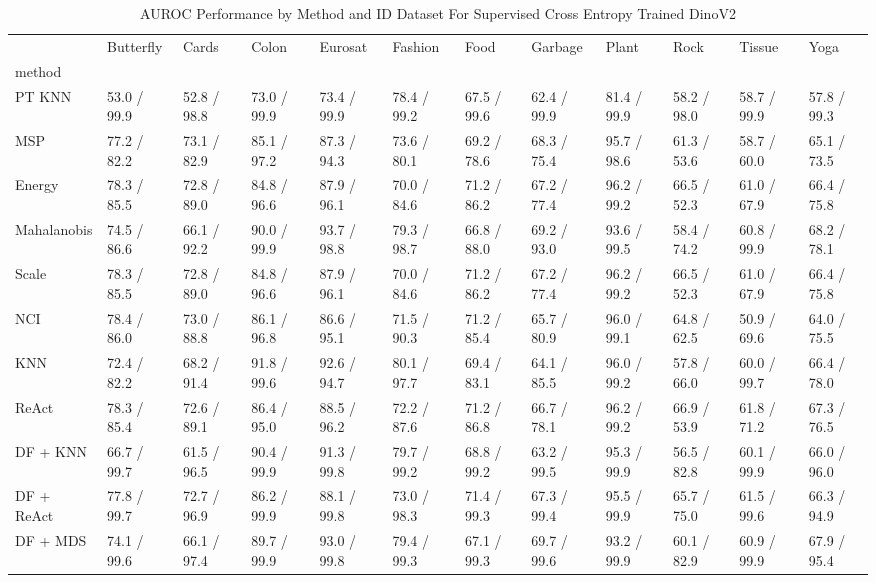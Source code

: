 \documentclass[letterpaper]{article} %
\theoremstyle{plain}
\theoremstyle{definition}
\theoremstyle{remark}
\begin{document}
\begin{table}
\caption{AUROC Performance by Method and ID Dataset For Supervised Cross Entropy Trained DinoV2}


\label{tab:auroc_results_dino}

\begin{tabular}{llllllllllll}
\toprule
  & Butterfly & Cards & Colon & Eurosat & Fashion & Food & Garbage & Plant & Rock & Tissue & Yoga \\
method &  &  &  &  &  &  &  &  &  &  &  \\
\midrule
PT KNN & 53.0 / 99.9 & 52.8 / 98.8 & 73.0 / 99.9 & 73.4 / 99.9 & 78.4 / 99.2 & 67.5 / 99.6 & 62.4 / 99.9 & 81.4 / 99.9 & 58.2 / 98.0 & 58.7 / 99.9 & 57.8 / 99.3 \\
MSP & 77.2 / 82.2 & 73.1 / 82.9 & 85.1 / 97.2 & 87.3 / 94.3 & 73.6 / 80.1 & 69.2 / 78.6 & 68.3 / 75.4 & 95.7 / 98.6 & 61.3 / 53.6 & 58.7 / 60.0 & 65.1 / 73.5 \\
Energy & 78.3 / 85.5 & 72.8 / 89.0 & 84.8 / 96.6 & 87.9 / 96.1 & 70.0 / 84.6 & 71.2 / 86.2 & 67.2 / 77.4 & 96.2 / 99.2 & 66.5 / 52.3 & 61.0 / 67.9 & 66.4 / 75.8 \\
Mahalanobis & 74.5 / 86.6 & 66.1 / 92.2 & 90.0 / 99.9 & 93.7 / 98.8 & 79.3 / 98.7 & 66.8 / 88.0 & 69.2 / 93.0 & 93.6 / 99.5 & 58.4 / 74.2 & 60.8 / 99.9 & 68.2 / 78.1 \\
Scale & 78.3 / 85.5 & 72.8 / 89.0 & 84.8 / 96.6 & 87.9 / 96.1 & 70.0 / 84.6 & 71.2 / 86.2 & 67.2 / 77.4 & 96.2 / 99.2 & 66.5 / 52.3 & 61.0 / 67.9 & 66.4 / 75.8 \\
NCI & 78.4 / 86.0 & 73.0 / 88.8 & 86.1 / 96.8 & 86.6 / 95.1 & 71.5 / 90.3 & 71.2 / 85.4 & 65.7 / 80.9 & 96.0 / 99.1 & 64.8 / 62.5 & 50.9 / 69.6 & 64.0 / 75.5 \\
KNN & 72.4 / 82.2 & 68.2 / 91.4 & 91.8 / 99.6 & 92.6 / 94.7 & 80.1 / 97.7 & 69.4 / 83.1 & 64.1 / 85.5 & 96.0 / 99.2 & 57.8 / 66.0 & 60.0 / 99.7 & 66.4 / 78.0 \\
ReAct & 78.3 / 85.4 & 72.6 / 89.1 & 86.4 / 95.0 & 88.5 / 96.2 & 72.2 / 87.6 & 71.2 / 86.8 & 66.7 / 78.1 & 96.2 / 99.2 & 66.9 / 53.9 & 61.8 / 71.2 & 67.3 / 76.5 \\
DF + KNN & 66.7 / 99.7 & 61.5 / 96.5 & 90.4 / 99.9 & 91.3 / 99.8 & 79.7 / 99.2 & 68.8 / 99.2 & 63.2 / 99.5 & 95.3 / 99.9 & 56.5 / 82.8 & 60.1 / 99.9 & 66.0 / 96.0 \\
DF + ReAct & 77.8 / 99.7 & 72.7 / 96.9 & 86.2 / 99.9 & 88.1 / 99.8 & 73.0 / 98.3 & 71.4 / 99.3 & 67.3 / 99.4 & 95.5 / 99.9 & 65.7 / 75.0 & 61.5 / 99.6 & 66.3 / 94.9 \\
DF + MDS & 74.1 / 99.6 & 66.1 / 97.4 & 89.7 / 99.9 & 93.0 / 99.8 & 79.4 / 99.3 & 67.1 / 99.3 & 69.7 / 99.6 & 93.2 / 99.9 & 60.1 / 82.9 & 60.9 / 99.9 & 67.9 / 95.4 \\
\bottomrule
\end{tabular}

\end{table}
\end{document}
